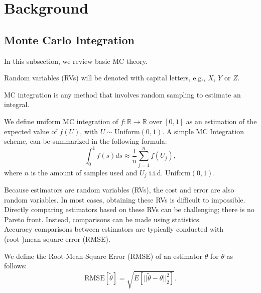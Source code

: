 \documentclass[a4paper,12pt]{article}
\begin{document}
\section{Background}

\subsection{Monte Carlo Integration}

In this subsection, we review basic MC theory. \\

\begin{notation}
  Random variables (RVs) will be denoted with capital letters, e.g., $X$, $Y$ or $Z$.
\end{notation}


MC integration is any method that involves random sampling to
estimate an integral.
\begin{definition}
  We define uniform MC integration of
  $f:\mathbb{R} \rightarrow \mathbb{R}$
  over $[0,1]$ as
  an estimation of the expected value of $f(U)$, with
  $U \sim \text{Uniform}(0,1)$. A simple MC Integration
  scheme, can be summarized in the following formula:
  \begin{equation}\label{eq:BLUE}
    \int_{0}^1 f(s)ds \approx \frac{1}{n} \sum_{j=1}^{n}f(U_{j}),
  \end{equation}
  where $n$ is the amount of samples used and $U_{j}$ i.i.d. $\text{Uniform}(0,1)$.
\end{definition}

Because estimators are random variables (RVs), the cost and error are also random
variables. In most cases, obtaining these RVs is difficult to impossible.
Directly comparing estimators based on these RVs can be challenging;
there is no Pareto front. Instead, comparisons can be made
using statistics. \\

Accuracy comparisons between estimators
are typically conducted with (root-)mean-square error (RMSE).
\begin{definition}
  We define the Root-Mean-Square Error (RMSE) of an estimator $\tilde{\theta}$ for $\theta$  as follows:
  \begin{equation}
    \text{RMSE}[\tilde{\theta}] = \sqrt{E[||\tilde{\theta}-\theta||^{2}_{2}]}.
  \end{equation}
\end{definition}
\end{document}
